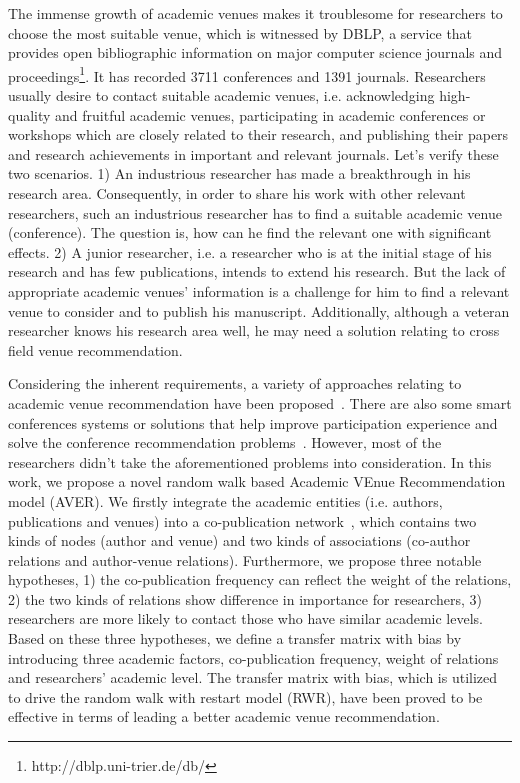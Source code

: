 \documentclass{sig-alternate-2013}
\begin{document}
The immense growth of academic venues makes it troublesome for researchers to choose the most suitable venue, which is witnessed by DBLP, a service that provides open bibliographic information on major computer science journals and proceedings\footnote{http://dblp.uni-trier.de/db/}. It has recorded 3711 conferences and 1391 journals. Researchers usually desire to contact suitable academic venues, i.e. acknowledging high-quality and fruitful academic venues, participating in academic conferences or workshops which are closely related to their research, and publishing their papers and research achievements in important and relevant journals. Let's verify these two scenarios. 1) An industrious researcher has made a breakthrough in his research area. Consequently, in order to share his work with other relevant researchers, such an industrious researcher has to find a suitable academic venue (conference). The question is, how can he find the relevant one with significant effects. 2) A junior researcher, i.e. a researcher who is at the initial stage of his research and has few publications, intends to extend his research. But the lack of appropriate academic venues' information is a challenge for him to find a relevant venue to consider and to publish his manuscript. Additionally, although a veteran researcher knows his research area well, he may need a solution relating to cross field venue recommendation.

Considering the inherent requirements, a variety of approaches relating to academic venue recommendation have been proposed~\cite{pham2011clustering,yang2012venue,luong2012publication,chen2012social,asabere2014improving}. There are also some smart conferences systems or solutions that help improve participation experience and solve the conference recommendation problems~\cite{wongchokprasitti2010conference}. However, most of the researchers didn't take the aforementioned problems into consideration. In this work, we propose a novel random walk based Academic VEnue Recommendation model (AVER). We firstly integrate the academic entities (i.e. authors, publications and venues) into a co-publication network~\cite{lemarchand2012long}, which contains two kinds of nodes (author and venue) and two kinds of associations (co-author relations and author-venue relations). Furthermore, we propose three notable hypotheses, 1) the co-publication frequency can reflect the weight of the relations, 2) the two kinds of relations show difference in importance for researchers, 3) researchers are more likely to contact those who have similar academic levels. Based on these three hypotheses, we define a transfer matrix with bias by introducing three academic factors, co-publication frequency, weight of relations and researchers' academic level. The transfer matrix with bias, which is utilized to drive the random walk with restart model (RWR), have been proved to be effective in terms of leading a better academic venue recommendation.
\end{document}
